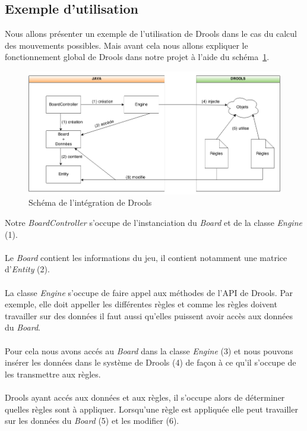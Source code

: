 		\subsection{Exemple d'utilisation}

			Nous allons présenter un exemple de l'utilisation de Drools dans le cas du calcul des mouvements possibles. Mais avant cela nous allons expliquer le fonctionnement global de Drools dans notre projet à l'aide du schéma~\ref{fig:drools_global_utilisation}.		
			\begin{figure}[!h]
			    \caption{Schéma de l'intégration de Drools}
			    \centerline{\includegraphics[scale=0.6]{images/architecture/drools_schema_use.png}}
			    \label{fig:drools_global_utilisation}
			\end{figure} 

			Notre {\itshape BoardController} s'occupe de l'instanciation du {\itshape Board} et de la classe {\itshape Engine} (1).
			\\ \\
			Le {\itshape Board} contient les informations du jeu, il contient notamment une matrice d'{\itshape Entity} (2).
			\\ \\
			La classe {\itshape Engine} s'occupe de faire appel aux méthodes de l'API de Drools. Par exemple, elle doit appeller les différentes règles et comme les règles doivent travailler sur des données il faut aussi qu'elles puissent avoir accès aux données du {\itshape Board}.
			\\ \\
			Pour cela nous avons accés au {\itshape Board} dans la classe {\itshape Engine} (3) et nous pouvons insérer les données dans le système de Drools (4) de façon à ce qu'il s'occupe de les transmettre aux règles.
			\\ \\
			Drools ayant accés aux données et aux règles, il s'occupe alors de déterminer quelles règles sont à appliquer. Lorsqu'une règle est appliquée elle peut travailler sur les données du {\itshape Board} (5) et les modifier (6). 

